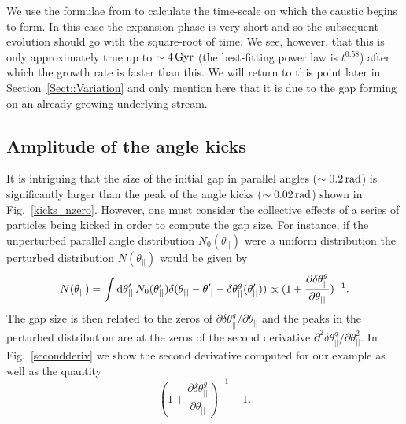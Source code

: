 \documentclass[useAMS,usenatbib,fleqn,a4paper]{mn2e}
\def\rad{\,\rm rad}
\def\Gyr{\,{\rm Gyr}}
\begin{document}
We use the formulae from \cite{ErkalBelokurov2015} to calculate the time-scale on which the caustic begins to form. In this case the expansion phase is very short and so the subsequent evolution should go with the square-root of time. We see, however, that this is only approximately true up to $\sim4\Gyr$ (the best-fitting power law is $t^{0.58}$) after which the growth rate is faster than this. We will return to this point later in Section~\ref{Sect::Variation} and only mention here that it is due to the gap forming on an already growing underlying stream.

\subsection{Amplitude of the angle kicks}\label{Sect::anggapamp}

It is intriguing that the size of the initial gap in parallel angles ($\sim0.2\rad$) is significantly larger than the peak of the angle kicks ($\sim0.02\rad$) shown in Fig.~\ref{kicks_nzero}. However, one must consider the collective effects of a series of particles being kicked in order to compute the gap size. For instance, if the unperturbed parallel angle distribution $N_0(\theta_{||})$ were a uniform distribution the perturbed distribution $N(\theta_{||})$ would be given by
\begin{equation}
N(\theta_{||})=\int {\rm d}\theta'_{||}\,N_0(\theta'_{||})\delta(\theta_{||}-\theta'_{||}-\delta\theta^g_{||}(\theta'_{||}))\propto(1+\frac{\partial\delta\theta^g_{||}}{\partial\theta_{||}})^{-1}.
\label{UniformAssump}
\end{equation}
The gap size is then related to the zeros of $\partial\delta\theta^g_{||}/\partial\theta_{||}$
and the peaks in the perturbed distribution are at the zeros of the second derivative
$
\partial^2\delta\theta^g_{||}/\partial\theta^{2}_{||}.
$
In Fig.~\ref{secondderiv} we show the second derivative computed for our example as well as the quantity
\begin{equation}
(1+\frac{\partial\delta\theta^g_{||}}{\partial\theta_{||}})^{-1}-1.
\label{deriv}
\end{equation}
\end{document}
